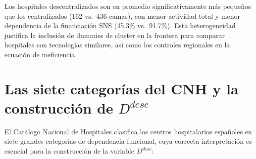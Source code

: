 Los hospitales descentralizados son en promedio significativamente más pequeños que los centralizados (162 vs.\ 436 camas), con menor actividad total y menor dependencia de la financiación SNS (45.3\% vs.\ 91.7\%). Esta heterogeneidad justifica la inclusión de dummies de cluster en la frontera para comparar hospitales con tecnologías similares, así como los controles regionales en la ecuación de ineficiencia.

\section{Las siete categorías del CNH y la construcción de \texorpdfstring{$D^{desc}$}{D\^{}desc}}
\label{sec:categorias_cnh}

El Catálogo Nacional de Hospitales clasifica los centros hospitalarios españoles en siete grandes categorías de dependencia funcional, cuya correcta interpretación es esencial para la construcción de la variable $D^{desc}$:

